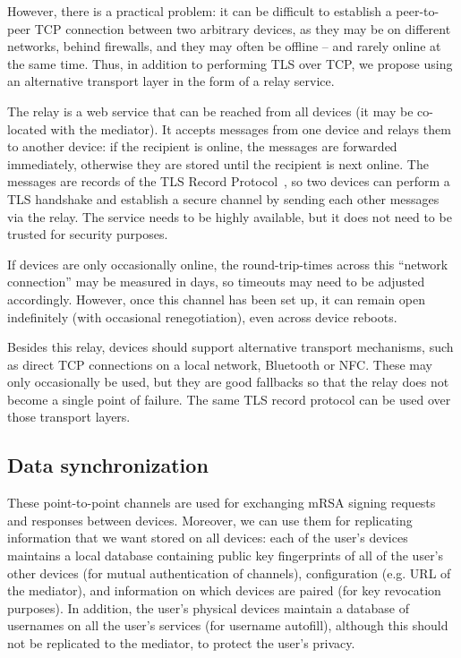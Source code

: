 However, there is a practical problem: it can be difficult to establish a peer-to-peer TCP
connection between two arbitrary devices, as they may be on different networks, behind firewalls,
and they may often be offline -- and rarely online at the same time. Thus, in addition to performing
TLS over TCP, we propose using an alternative transport layer in the form of a relay service.

The relay is a web service that can be reached from all devices (it may be co-located with the
mediator). It accepts messages from one device and relays them to another device: if the recipient
is online, the messages are forwarded immediately, otherwise they are stored until the recipient is
next online. The messages are records of the TLS Record Protocol~\cite{TLS}, so two devices can
perform a TLS handshake and establish a secure channel by sending each other messages via the relay.
The service needs to be highly available, but it does not need to be trusted for security purposes.

If devices are only occasionally online, the round-trip-times across this ``network connection'' may
be measured in days, so timeouts may need to be adjusted accordingly. However, once this channel has
been set up, it can remain open indefinitely (with occasional renegotiation), even across device
reboots.

Besides this relay, devices should support alternative transport mechanisms, such as direct TCP
connections on a local network, Bluetooth or NFC. These may only occasionally be used, but they are
good fallbacks so that the relay does not become a single point of failure. The same TLS record
protocol can be used over those transport layers.

\subsection{Data synchronization}\label{sec:devicesync}

These point-to-point channels are used for exchanging mRSA signing requests and responses between
devices. Moreover, we can use them for replicating information that we want stored on all devices:
each of the user's devices maintains a local database containing public key fingerprints of all of
the user's other devices (for mutual authentication of channels), configuration (e.g. URL of the
mediator), and information on which devices are paired (for key revocation purposes). In addition,
the user's physical devices maintain a database of usernames on all the user's services (for
username autofill), although this should not be replicated to the mediator, to protect the user's
privacy.

